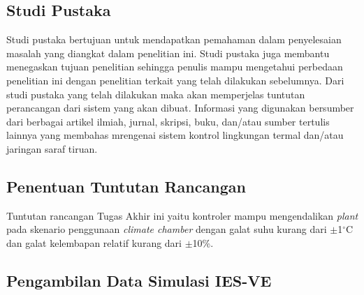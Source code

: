 

\subsection{Studi Pustaka}
Studi pustaka bertujuan untuk mendapatkan pemahaman dalam penyelesaian masalah yang diangkat dalam penelitian ini. Studi pustaka juga membantu menegaskan tujuan penelitian sehingga penulis mampu mengetahui perbedaan penelitian ini dengan penelitian terkait yang telah dilakukan sebelumnya. Dari studi pustaka yang telah dilakukan maka akan memperjelas tuntutan perancangan dari sistem yang akan dibuat. Informasi yang digunakan bersumber dari berbagai artikel ilmiah, jurnal, skripsi, buku, dan/atau sumber tertulis lainnya yang membahas mrengenai sistem kontrol lingkungan termal dan/atau jaringan saraf tiruan.

\subsection{Penentuan Tuntutan Rancangan}

Tuntutan rancangan Tugas Akhir ini yaitu kontroler mampu mengendalikan \textit{plant} pada skenario penggunaan \textit{climate chamber} dengan galat suhu kurang dari $\pm$1$^\circ$C dan galat kelembapan relatif kurang dari $\pm$10\%.


\subsection{Pengambilan Data Simulasi IES-VE}

